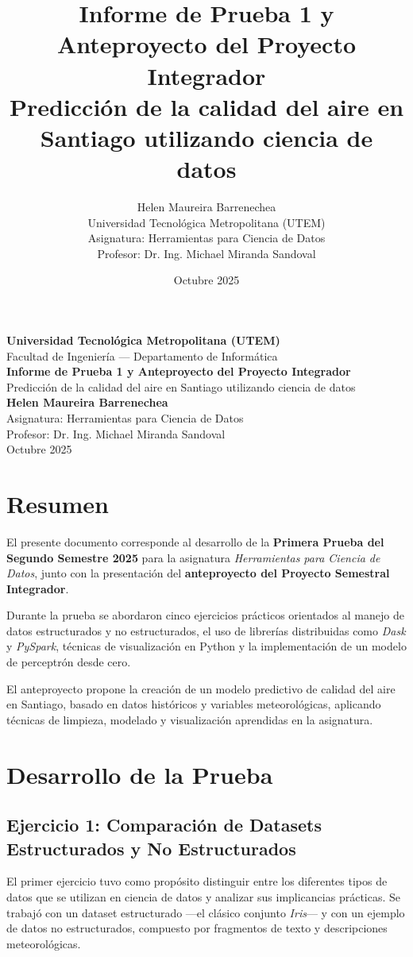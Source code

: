 \documentclass[12pt,a4paper]{article}
\title{
    \textbf{Informe de Prueba 1 y Anteproyecto del Proyecto Integrador}\\[0.4em]
    \large Predicción de la calidad del aire en Santiago utilizando ciencia de datos
}
\author{
    Helen Maureira Barrenechea \\[0.3em]
    Universidad Tecnológica Metropolitana (UTEM) \\[0.3em]
    Asignatura: Herramientas para Ciencia de Datos \\[0.3em]
    Profesor: Dr. Ing. Michael Miranda Sandoval
}
\date{Octubre 2025}
\begin{document}
\begin{titlepage}
    \centering
   
    {\Large \textbf{Universidad Tecnológica Metropolitana (UTEM)}}\\[0.5cm]
    {\large Facultad de Ingeniería — Departamento de Informática}\\[2cm]
    {\huge \textbf{Informe de Prueba 1 y Anteproyecto del Proyecto Integrador}}\\[0.8cm]
    {\Large Predicción de la calidad del aire en Santiago utilizando ciencia de datos}\\[2cm]
    \textbf{Helen Maureira Barrenechea}\\[0.3cm]
    Asignatura: Herramientas para Ciencia de Datos\\
    Profesor: Dr. Ing. Michael Miranda Sandoval\\[2cm]
    Octubre 2025
\end{titlepage}


\newpage
\tableofcontents
\newpage

\section{Resumen}
El presente documento corresponde al desarrollo de la \textbf{Primera Prueba del Segundo Semestre 2025} para la asignatura \textit{Herramientas para Ciencia de Datos}, junto con la presentación del \textbf{anteproyecto del Proyecto Semestral Integrador}.  

Durante la prueba se abordaron cinco ejercicios prácticos orientados al manejo de datos estructurados y no estructurados, el uso de librerías distribuidas como \textit{Dask} y \textit{PySpark}, técnicas de visualización en Python y la implementación de un modelo de perceptrón desde cero.  

El anteproyecto propone la creación de un modelo predictivo de calidad del aire en Santiago, basado en datos históricos y variables meteorológicas, aplicando técnicas de limpieza, modelado y visualización aprendidas en la asignatura.

\section{Desarrollo de la Prueba}

\subsection{Ejercicio 1: Comparación de Datasets Estructurados y No Estructurados}
El primer ejercicio tuvo como propósito distinguir entre los diferentes tipos de datos que se utilizan en ciencia de datos y analizar sus implicancias prácticas.  
Se trabajó con un dataset estructurado —el clásico conjunto \textit{Iris}— y con un ejemplo de datos no estructurados, compuesto por fragmentos de texto y descripciones meteorológicas.  
\end{document}
